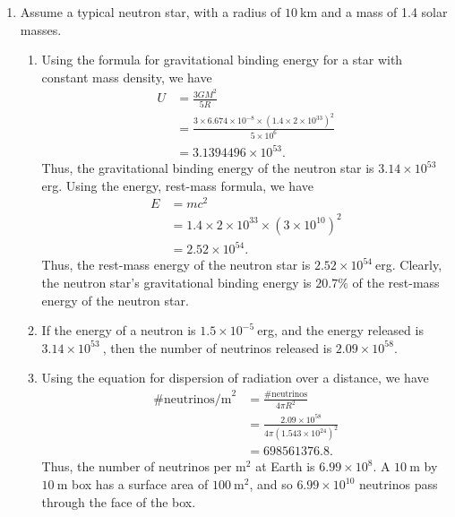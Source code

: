 \documentclass[a4paper,11pt]{article}
\newcommand{\ds}{\displaystyle}
\begin{document}
{{\begin{enumerate}[leftmargin=*]
\begin{enumerate}[label=\alph*)]
\begin{align*}
									 & = 5.555555556\times 10^{18}.
					\end{align*}
					Thus, the mass accretion rate onto Cygnus X-1 is $\ds{5.56 \times 10^{18}\:}$g/sec, which is $\ds{8.6\times 10^{-8}\:\text{M}_{\odot}}$/year.
			\end{enumerate}
		\item Assume a typical neutron star, with a radius of $\ds{10\:}$km and a mass of 1.4 solar masses.
			\begin{enumerate}[label=\alph*)]
				\item Using the formula for gravitational binding energy for a star with constant mass density, we have
					\begin{align*}
						U & = \frac{3GM^2}{5R} \\
						  & = \frac{3\times 6.674\times 10^{-8}\times \left(1.4\times 2\times 10^{33} \right)^2}{5\times 10^6} \\
						  & = 3.1394496 \times 10^{53}.
					\end{align*}
					Thus, the gravitational binding energy of the neutron star is $\ds{3.14 \times 10^{53}\:}$erg. Using the energy, rest-mass formula, we have
					\begin{align*}
						E & = mc^2 \\
						  & = 1.4\times 2\times 10^{33} \times \left(3\times 10^{10}\right)^2 \\
						  & = 2.52\times 10^{54}.
					\end{align*}
					Thus, the rest-mass energy of the neutron star is $\ds{2.52\times 10^{54}\:}$erg. Clearly, the neutron star's gravitational binding energy is $\ds{20.7\%}$ of the rest-mass energy of the neutron star.
				\item If the energy of a neutron is $\ds{1.5\times 10^{-5}\:}$erg, and the energy released is $\ds{3.14\times 10^{53}\:}$, then the number of neutrinos released is $\ds{2.09\times 10^{58}}$.
				\item Using the equation for dispersion of radiation over a distance, we have 
					\begin{align*}
						\text{\# neutrinos/m}^2 & = \frac{\text{\# neutrinos}}{4\pi R^2} \\
												& = \frac{2.09\times 10^{58}}{4\pi \left(1.543\times 10^24 \right)^2} \\
												& = 698561376.8.
					\end{align*}
					Thus, the number of neutrinos per $\ds{\text{m}^2}$ at Earth is $\ds{6.99 \times 10^8}$. A $\ds{10\:}$m by $\ds{10\:}$m box has a surface area of $\ds{100\:\text{m}^2}$, and so $\ds{6.99 \times 10^{10}}$ neutrinos pass through the face of the box.

\end{enumerate}
\end{enumerate}}}
\end{document}
